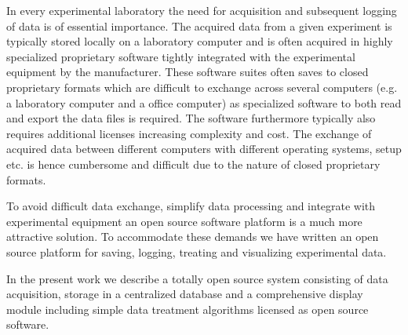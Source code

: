 In every experimental laboratory the need for acquisition and subsequent
logging of data is of essential importance. The acquired data from a given
experiment is typically stored locally on a laboratory computer and is often
acquired in highly specialized proprietary software tightly integrated with the
experimental equipment by the manufacturer. These software suites often saves
to closed proprietary formats which are difficult to exchange across several
computers (e.g. a laboratory computer and a office computer) as specialized
software to both read and export the data files is required. The software
furthermore typically also requires additional licenses increasing complexity
and cost. The exchange of acquired data between different computers with
different operating systems, setup etc. is hence cumbersome and difficult due
to the nature of closed proprietary formats.

To avoid difficult data exchange, simplify data processing and integrate with
experimental equipment an open source software platform is a much more
attractive solution\cite{Benn2009,Murray2011,So2007}. To accommodate these
demands we have written an open source platform for saving, logging, treating
and visualizing experimental data.

In the present work we describe a totally open source system consisting of data
acquisition, storage in a centralized database and a comprehensive display
module including simple data treatment algorithms licensed as open source
software.
